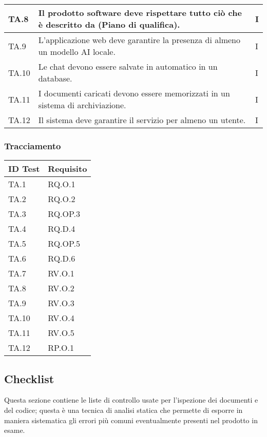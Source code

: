 {{{{{{{{{\begin{tabularx}{\textwidth}{p{}|p{}|X}
    \hline
    TA.8 & Il prodotto software deve rispettare tutto ciò che è descritto da (Piano di qualifica). & I \\
    \hline
    TA.9 & L’applicazione web deve garantire la presenza di almeno un modello AI locale. & I \\
    \hline
    TA.10 & Le chat devono essere salvate in automatico in un database. & I \\
    \hline
    TA.11 & I documenti caricati devono essere memorizzati in un sistema di archiviazione. & I \\
    \hline
    TA.12 & Il sistema deve garantire il servizio per almeno un utente. & I \\
    \end{tabularx}}

    \subsubsection{Tracciamento}
    {\renewcommand{\arraystretch}{1.5}
    \begin{tabularx}{\textwidth}{p{}|X}
    \textbf{ID Test} & \textbf{Requisito}  \\
    \hline
    TA.1 & RQ.O.1 \\
    \hline
    TA.2 & RQ.O.2 \\
    \hline
    TA.3 & RQ.OP.3 \\
    \hline
    TA.4 & RQ.D.4 \\
    \hline
    TA.5 & RQ.OP.5 \\
    \hline
    TA.6 & RQ.D.6 \\
    \hline
    TA.7 & RV.O.1 \\
    \hline
    TA.8 & RV.O.2 \\
    \hline
    TA.9 & RV.O.3 \\
    \hline
    TA.10 & RV.O.4 \\
    \hline
    TA.11 & RV.O.5 \\
    \hline
    TA.12 & RP.O.1 \\
    \end{tabularx}}


\subsection{Checklist }
Questa sezione contiene le liste di controllo usate per l'ispezione dei documenti e del codice; questa è una tecnica di analisi statica che permette di esporre in maniera sistematica gli errori più comuni eventualmente presenti nel prodotto in esame.
}}}}}}}}
